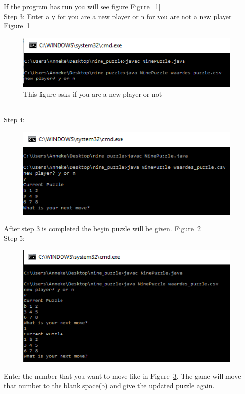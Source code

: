 \documentclass[10pt]{article}
\begin{document}
If the program has run you will see figure Figure~\ref{1}
\\Step 3: Enter a y for you are a new player or n for you are not a new player Figure~\ref{prent1}
\begin{figure}
\centering
 \includegraphics[scale=0.8]{./Prente/prent1.png}
  \caption{This figure asks if you are a new player or not}
  \label{prent1}
\end{figure}
\\Step 4:
\begin{figure}
\centering
 \includegraphics[scale=0.8]{./Prente/prent2.png}
 \caption{}
 \label{prent2}
\end{figure}
After step 3 is completed the begin puzzle will be given. Figure~\ref{prent2}
\\Step 5:
\begin{figure}
\centering
 \includegraphics[scale=0.8]{./Prente/prent3.png}
 \caption{}
 \label{prent3}
\end{figure}
Enter the number that you want to move like in Figure~\ref{prent3}. The game will move that number to the blank space(b) and give the updated puzzle again.
\end{document}

